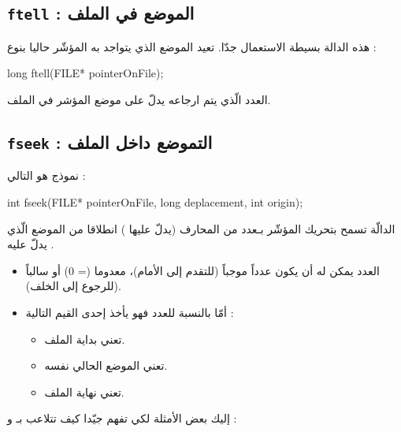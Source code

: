 \subsection{\texttt{ftell} : الموضع في الملف}

هذه الدالة بسيطة الاستعمال جدّا. تعيد الموضع الذي يتواجد به المؤشّر حاليا بنوع
 :

\begin{Csource}
long ftell(FILE* pointerOnFile);
\end{Csource}

العدد الّذي يتم ارجاعه يدلّ على موضع المؤشر في الملف.

\subsection{\texttt{fseek} : التموضع داخل الملف}

نموذج
هو التالي :

\begin{Csource}
int fseek(FILE* pointerOnFile, long deplacement, int origin);
\end{Csource}

الدالّة
تسمح بتحريك المؤشّر بـعدد من المحارف (يدلّ عليها
)
انطلاقا من الموضع الّذي يدلّ عليه
.

\begin{itemize}
  \item العدد
يمكن له أن يكون عدداً موجباً (للتقدم إلى الأمام)، معدوما (= 0) أو سالباً (للرجوع إلى الخلف).
  \item أمّا بالنسبة للعدد
فهو يأخذ إحدى القيم التالية :
  \begin{itemize}
    \item {}
تعني بداية الملف.
    \item {}
تعني الموضع الحالي نفسه.
    \item {}
تعني نهاية الملف.
  \end{itemize}
\end{itemize}

إليك بعض الأمثلة لكي تفهم جيّدا كيف تتلاعب بـ
و
 :

